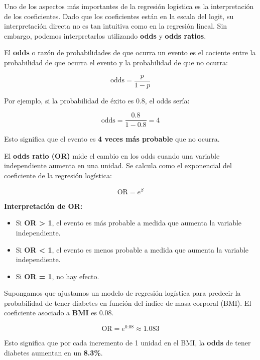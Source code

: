 \documentclass[
  letterpaper,
  DIV=11,
  numbers=noendperiod]{scrreprt}
\providecommand{\tightlist}{%
  \setlength{\itemsep}{0pt}\setlength{\parskip}{0pt}}
\begin{document}
Uno de los aspectos más importantes de la regresión logística es la
interpretación de los coeficientes. Dado que los coeficientes están en
la escala del logit, su interpretación directa no es tan intuitiva como
en la regresión lineal. Sin embargo, podemos interpretarlos utilizando
\textbf{odds} y \textbf{odds ratios}.

El \textbf{odds} o razón de probabilidades de que ocurra un evento es el
cociente entre la probabilidad de que ocurra el evento y la probabilidad
de que no ocurra:

\[
\text{odds} = \frac{p}{1 - p}
\]

Por ejemplo, si la probabilidad de éxito es 0.8, el odds sería:

\[
\text{odds} = \frac{0.8}{1 - 0.8} = 4
\]

Esto significa que el evento es \textbf{4 veces más probable} que no
ocurra.

El \textbf{odds ratio (OR)} mide el cambio en los odds cuando una
variable independiente aumenta en una unidad. Se calcula como el
exponencial del coeficiente de la regresión logística:

\[
\text{OR} = e^{\beta}
\]

\textbf{Interpretación de OR:}

\begin{itemize}
\tightlist
\item
  Si \textbf{OR \textgreater{} 1}, el evento es más probable a medida
  que aumenta la variable independiente.
\item
  Si \textbf{OR \textless{} 1}, el evento es menos probable a medida que
  aumenta la variable independiente.
\item
  Si \textbf{OR = 1}, no hay efecto.
\end{itemize}

\begin{tcolorbox}[enhanced jigsaw, breakable, toprule=.15mm, bottomtitle=1mm, coltitle=black, colbacktitle=quarto-callout-tip-color!10!white, titlerule=0mm, opacitybacktitle=0.6, bottomrule=.15mm, toptitle=1mm, title=\textcolor{quarto-callout-tip-color}{\faLightbulb}\hspace{0.5em}{Ejemplo}, arc=.35mm, rightrule=.15mm, opacityback=0, colframe=quarto-callout-tip-color-frame, leftrule=.75mm, left=2mm, colback=white]

Supongamos que ajustamos un modelo de regresión logística para predecir
la probabilidad de tener diabetes en función del índice de masa corporal
(BMI). El coeficiente asociado a \textbf{BMI} es 0.08.

\[
\text{OR} = e^{0.08} \approx 1.083
\]

Esto significa que por cada incremento de 1 unidad en el BMI, la
\textbf{odds} de tener diabetes aumentan en un \textbf{8.3\%}.

\end{tcolorbox}
\end{document}
